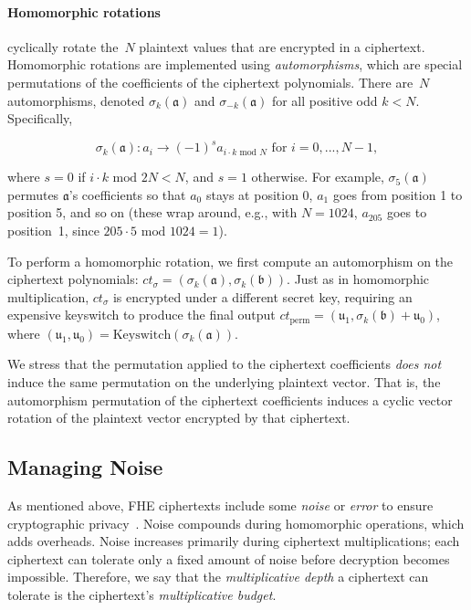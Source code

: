 \paragraph{Homomorphic rotations} cyclically rotate the~$N$ plaintext values
that are encrypted in a ciphertext. Homomorphic rotations are
implemented using \emph{automorphisms}, which are special permutations of the
coefficients of the ciphertext polynomials.  There are~$N$ automorphisms,
denoted
$\sigma_k(\mathfrak{a})$ and $\sigma_{-k}(\mathfrak{a})$ for all
positive odd $k<N$. Specifically,

\begin{equation*}
  \sigma_k(\mathfrak{a}): a_i \rightarrow (-1)^{s} a_{i \cdot k \textrm{ mod } N} \text{ for } i=0,...,N-1,
\end{equation*}

where $s=0$ if $i \cdot k \textrm{ mod } 2N < N$, and $s=1$ otherwise. For example,
$\sigma_{5}(\mathfrak{a})$ permutes $\mathfrak{a}$'s coefficients so that $a_0$
stays at position 0, $a_1$ goes from position 1 to position 5, and so on (these
wrap around, e.g., with $N=1024$, $a_{205}$ goes to position~1, since
$205\cdot5 \textrm{ mod } 1024 = 1$).

To perform a homomorphic rotation, we first compute an automorphism on the
ciphertext polynomials: $ct_{\sigma} = (\sigma_k(\mathfrak{a}),
\sigma_k(\mathfrak{b}))$. Just as in homomorphic multiplication, $ct_{\sigma}$
is encrypted under a different secret key, requiring an expensive keyswitch to
produce the final output $ct_{\text{perm}} = (\mathfrak{u}_1,
\sigma_{k}(\mathfrak{b}) + \mathfrak{u}_0)$, where $(\mathfrak{u}_1,
\mathfrak{u}_0) = \text{Keyswitch}(\sigma_k (\mathfrak{a}))$.

We stress that the permutation applied to the ciphertext coefficients
\emph{does not} induce the same permutation on the underlying plaintext vector.
That is, the automorphism permutation of the ciphertext coefficients induces a
cyclic vector rotation of the plaintext vector encrypted by that ciphertext.


\subsection{Managing Noise}
\label{sec:noisemgmt}

As mentioned above, FHE ciphertexts include some \emph{noise} or \emph{error}
to ensure cryptographic privacy~\cite{lyubashevsky:tact10:ideal}. Noise
compounds during homomorphic operations, which adds overheads. Noise increases
primarily during ciphertext multiplications; each ciphertext can tolerate only
a fixed amount of noise before decryption becomes impossible. Therefore, we say
that the \emph{multiplicative depth} a ciphertext can tolerate is the
ciphertext's \emph{multiplicative budget}.

